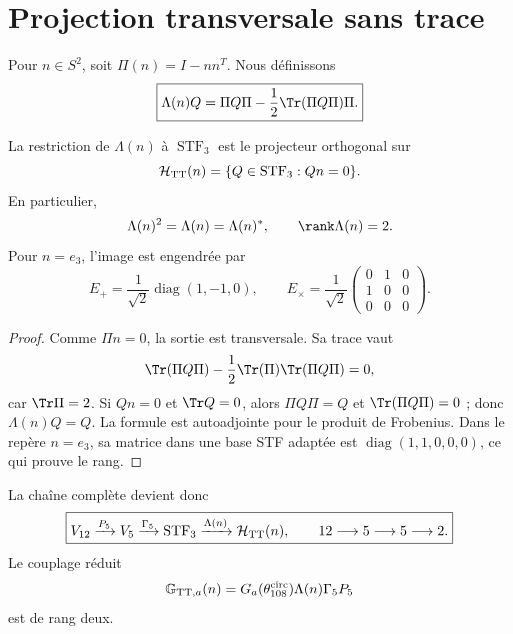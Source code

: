 \section{Projection transversale sans trace}

Pour \(n\in S^2\), soit \(\Pi(n)=I-nn^T\). Nous définissons
\begin{equation}
\label{rm:eq:gravity-lambda-tt}
\boxed{
\Lambda(n)Q
=\Pi Q\Pi-\frac12\Tr(\Pi Q\Pi)\Pi.}
\end{equation}

\begin{theorem}
\label{rm:thm:gravity-tt}
La restriction de \(\Lambda(n)\) à \(\operatorname{STF}_3\) est le
projecteur orthogonal sur
\begin{equation}
\label{rm:eq:gravity-htt}
\mathcal H_{\rm TT}(n)
=\{Q\in\operatorname{STF}_3:Qn=0\}.
\end{equation}
En particulier,
\begin{equation}
\label{rm:eq:gravity-lambda-properties}
\Lambda(n)^2=\Lambda(n)=\Lambda(n)^*,
\qquad \rank\Lambda(n)=2.
\end{equation}
Pour \(n=e_3\), l’image est engendrée par
\begin{equation}
\label{rm:eq:gravity-plus-cross}
E_+=\frac1{\sqrt2}\operatorname{diag}(1,-1,0),
\qquad
E_\times=\frac1{\sqrt2}
\begin{pmatrix}0&1&0\\1&0&0\\0&0&0\end{pmatrix}.
\end{equation}
\end{theorem}

\begin{proof}
Comme \(\Pi n=0\), la sortie est transversale. Sa trace vaut
\[
\Tr(\Pi Q\Pi)-\frac12\Tr(\Pi)\Tr(\Pi Q\Pi)=0,
\]
car \(\Tr\Pi=2\). Si \(Qn=0\) et \(\Tr Q=0\), alors
\(\Pi Q\Pi=Q\) et \(\Tr(\Pi Q\Pi)=0\) ; donc
\(\Lambda(n)Q=Q\). La formule est autoadjointe pour le produit de
Frobenius. Dans le repère \(n=e_3\), sa matrice dans une base STF adaptée est
\(\operatorname{diag}(1,1,0,0,0)\), ce qui prouve le rang.
\end{proof}

La chaîne complète devient donc
\begin{equation}
\label{rm:eq:gravity-12-5-5-2}
\boxed{
V_{12}\xrightarrow{P_5}V_5
\xrightarrow{\Gamma_5}\operatorname{STF}_3
\xrightarrow{\Lambda(n)}\mathcal H_{\rm TT}(n),
\qquad 12\longrightarrow5\longrightarrow5\longrightarrow2.}
\end{equation}
Le couplage réduit
\begin{equation}
\label{rm:eq:gravity-effective-map}
\mathbb G_{{\rm TT},a}(n)
=G_a(\theta_{108}^{\rm circ})\Lambda(n)\Gamma_5P_5
\end{equation}
est de rang deux.
